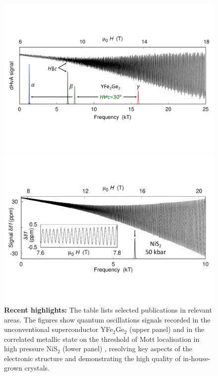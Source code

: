 \begin{figure}
\centerline{\includegraphics[width=\columnwidth]{Figures/YFGQOPlotFig}}
\centerline{\includegraphics[width=\columnwidth]{Figures/NiS2QOPlotFig}}
\caption{{\bf Recent highlights:} The table lists selected
  publications in relevant areas. The figures show quantum oscillations signals recorded in the unconventional superconductor YFe$_2$Ge$_2$ (upper panel) \protect{} and in the correlated metallic state on the  threshold of Mott localisation in high pressure NiS$_2$ (lower panel) \protect{},
resolving key aspects of the electronic structure and demonstrating the high quality of in-house-grown crystals. }%
\label{fig:Highlights}
\end{figure} 



